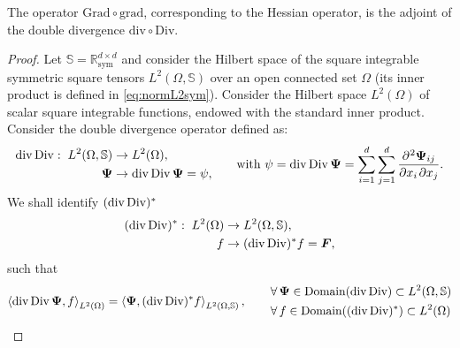 \begin{theorem}
	The operator $\mathrm{Grad} \circ \mathrm{grad}$, corresponding to the Hessian operator, is the adjoint of the double divergence $\mathrm{div} \circ \mathrm{Div}$.
	\begin{proof}
		Let $\mathbb{S} = \mathbb{R}^{d \times d}_{\text{sym}}$ and consider the Hilbert space of the square integrable symmetric square tensors  $L^2(\Omega, \mathbb{S})$ over an open connected set $\Omega$ (its inner product is defined in \eqref{eq:normL2sym}). 		Consider the Hilbert space $L^2(\Omega)$ of scalar square integrable functions, endowed with the standard inner product. Consider the double divergence operator defined as: 
		\begin{equation*}
		\begin{aligned}
		\div\Div: \; L^2(\Omega, \mathbb{S})& \rightarrow L^2(\Omega), \\
		\bm{\Psi}& \rightarrow \div\Div \bm{\Psi} = \psi, \\	\end{aligned}
		\qquad \text{with } \psi = \div\Div \bm{\Psi} = \sum_{i = 1}^d \sum_{j = 1}^d \diffp{\bm{\Psi}_{ij}}{x_i,x_j}.
		\end{equation*}
		We {shall} identify $(\operatorname{div}\operatorname*{Div})^*$
		\begin{equation*}
		\begin{aligned}
		(\operatorname{div}\operatorname*{Div})^{*}: \; L^2(\Omega)& \rightarrow L^2(\Omega, \mathbb{S}), \\
		f& \rightarrow  (\operatorname{div}\operatorname*{Div})^{*} f = \bm{F}, \\
		\end{aligned}
		\end{equation*}
		such that 
		\begin{equation*}
		\left\langle \operatorname{div}\operatorname*{Div} \bm{\Psi} , f \right\rangle_{L^2(\Omega)} = \left\langle \bm{\Psi} , (\operatorname{div}\operatorname*{Div})^* f \right\rangle_{L^2(\Omega, \mathbb{S})},
		\begin{aligned} \qquad
		&\forall \,\bm{\Psi} \in \mathrm{Domain}(\operatorname{div}\operatorname*{Div}) \subset L^2(\Omega, \mathbb{S}) \\
		&\forall \,f \in \mathrm{Domain}((\operatorname{div}\operatorname*{Div})^*) \subset L^2(\Omega)
		\end{aligned}
		\end{equation*}
		

\end{proof}
\end{theorem}
